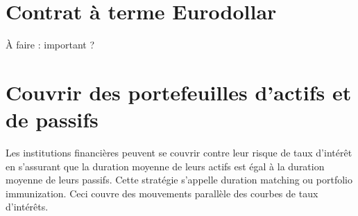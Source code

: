 \section{Contrat à terme Eurodollar}

À faire : important ?

\section{Couvrir des portefeuilles d'actifs et de passifs}

Les institutions financières peuvent se couvrir contre leur risque de taux d'intérêt en s'assurant que la duration moyenne de leurs actifs est égal à la duration moyenne de leurs passifs. Cette stratégie s'appelle duration matching ou portfolio immunization. Ceci couvre des mouvements parallèle des courbes de taux d'intérêts. 





































































